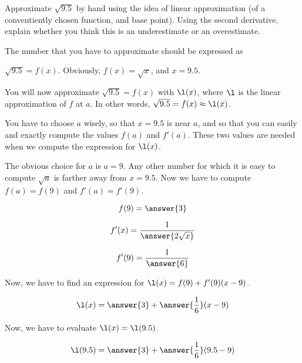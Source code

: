 \documentclass{ximera}
\author{Steven Gubkin\and Nela Lakos}
\begin{document}
\begin{exercise}

Approximate $\sqrt{9.5}$ by hand using the idea of linear approximation (of a conventiently chosen function, and base point).  Using the second derivative, explain whether you think this is an underestimate or an overestimate.
\begin {hint}

The number that you have to approximate should be expressed as

 $\sqrt{9.5}=f(x)$.
Obviously, $f(x)=\sqrt{x}$, and $x=9.5$.
\end {hint}
\begin {hint}

You will now approximate  $\sqrt{9.5}=f(x)$
 with $\l (x)$, where $\l$ is the linear approximation of $f$ at $a$.
In other words, $\sqrt{9.5}=f(x)\approx \l(x)$.

 You have to choose $a$  wisely, so that $x=9.5$ is near $a$, and so that you can easily and exactly compute the values $f(a)$ and $f'(a)$.
 These two values are needed when we compute the expression for $\l (x)$. 
\end {hint}
\begin {hint}
The obvious choice for $a$ is $a=9$. Any other number for which it is easy to compute $\sqrt{a}$ is farther away from $x=9.5$.
Now we have to compute $f(a)=f(9)$ and $f'(a)=f'(9)$.
\begin{prompt}
	$$f(9)=  \answer{3}$$
	\end{prompt}
	\begin{prompt}
	$$f'(x)= \frac{1}{ \answer{2\sqrt{x}}}$$
	\end{prompt}
	\begin{prompt}
	$$f'(9)= \frac{1}{ \answer{6}}$$
	\end{prompt}
\end {hint}
\begin {hint}

Now, we have to find an expression for $\l(x)=f(9)+f'(9)(x-9)$.
\begin{prompt}
	$$\l(x)= \answer{3}+\answer{\frac{1}{6}}(x-9)$$
	\end{prompt}
 
\end {hint}
\begin {hint}

Now, we have to evaluate $\l(x)=\l(9.5)$.
\begin{prompt}
	$$\l(9.5)= \answer{3}+\answer{\frac{1}{6}}(9.5-9)$$
	\end{prompt}
 

\end{hint}
\end{exercise}
\end{document}
